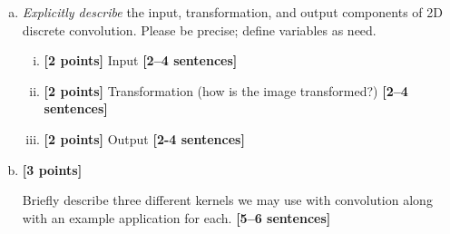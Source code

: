 \documentclass[11pt]{article}
\begin{document}
\begin{enumerate}[(a)]
\item 
\begin{tcolorbox}[colback=orange!5!white,colframe=orange!75!black]
\emph{Explicitly describe} the input, transformation, and output components of 2D discrete convolution. Please be precise; define variables as need.
\end{tcolorbox}
\begin{enumerate}[(i)]
    \item \textbf{[2 points]} Input \textbf{[2--4 sentences]}
    
    \item \textbf{[2 points]} Transformation (how is the image transformed?) \textbf{[2--4 sentences]} 
    
\pagebreak

    \item \textbf{[2 points]} Output \textbf{[2-4 sentences]}
    
\end{enumerate}


\item \textbf{[3 points]} 
\begin{tcolorbox}[colback=orange!5!white,colframe=orange!75!black]
Briefly describe three different kernels we may use with convolution along with an example application for each. \textbf{[5--6 sentences]}
\end{tcolorbox}


\end{enumerate}
\end{document}
